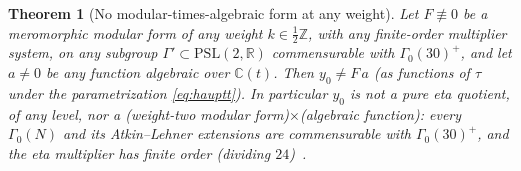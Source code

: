 \documentclass[11pt]{article}
\theoremstyle{plain}
\newtheorem{thm}{Theorem}[section]
\theoremstyle{remark}
\begin{document}
\begin{thm}[No modular-times-algebraic form at any weight]\label{thm:noalg}
Let $F\not\equiv0$ be a
meromorphic modular form of any weight $k\in\tfrac12\mathbb{Z}$, with any finite-order
multiplier system, on any subgroup $\Gamma'\subset\mathrm{PSL}(2,\mathbb{R})$ commensurable
with $\Gamma_0(30)^+$, and let $a\neq0$ be any function algebraic over $\mathbb{C}(t)$. Then
$y_0\neq F\,a$ (as functions of $\tau$ under the parametrization \eqref{eq:hauptt}). In
particular $y_0$ is not a pure eta quotient, of any level, nor a (weight-two modular
form)$\times$(algebraic function): every $\Gamma_0(N)$ and its Atkin--Lehner extensions are
commensurable with $\Gamma_0(30)^+$, and the eta multiplier has finite order (dividing
$24$)~\cite{DiamondShurman,Ligozat1975}.
\end{thm}
\end{document}
